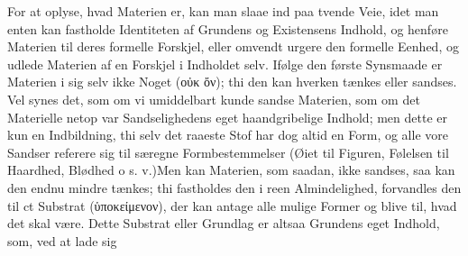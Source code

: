 \documentclass[12pt]{book}
\newcommand{\opage}[1]{\marginnote{\footnotesize\textit{[#1]}}}
\begin{document}
For at oplyse, hvad Materien er, kan man slaae ind paa tvende Veie, idet man enten kan fastholde
Identiteten af Grundens og Existensens Indhold, og henføre Materien til deres formelle Forskjel,
eller omvendt urgere den formelle Eenhed, og udlede Materien af en Forskjel i Indholdet selv.
Ifølge den første Synsmaade er Materien i sig selv ikke Noget (οὐκ ὄν); thi den kan hverken
tænkes eller sandses. Vel synes det, som om vi umiddelbart kunde sandse Materien, som om det
Materielle netop var Sandselighedens eget haandgribelige Indhold; men dette er kun en
Indbildning, thi selv det raaeste Stof har dog altid en Form, og alle vore Sandser referere sig
til særegne Formbestemmelser (Øiet til Figuren, Følelsen til Haardhed, Blødhed o s. v.)\quad Men
kan Materien, som saadan, ikke sandses, saa kan den endnu mindre tænkes; thi fastholdes den i
reen Almindelighed, forvandles den til ct Substrat (ὑποκείμενον), der kan antage alle mulige
Former og blive til, hvad det skal være. Dette Substrat eller Grundlag er altsaa Grundens eget
Indhold, som, ved at lade sig
\opage{134} %
\end{document}
